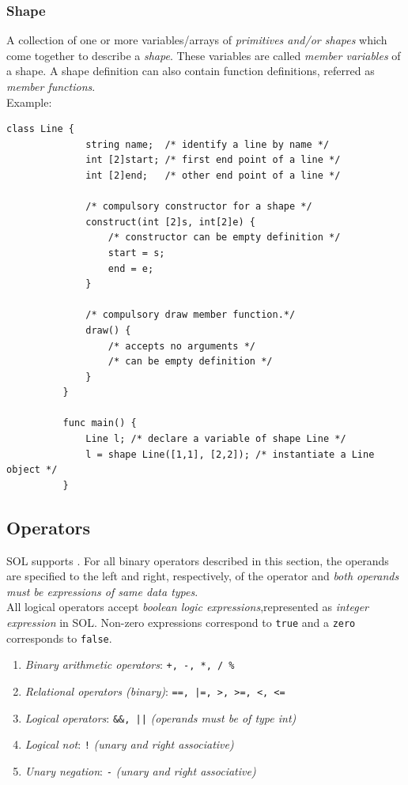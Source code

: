 \documentclass[letterpaper,12pt]{report}
\begin{document}
      \subsubsection{Shape}
        A collection of one or more variables/arrays of \textit{primitives and/or shapes} which come together to describe a \textit{shape}. These variables are called \textit{member variables} of a shape. A shape definition can also contain function definitions, referred as \textit{member functions}.\\
        Example:\\
        \begin{lstlisting}[style=sol]
          class Line {
              string name;  /* identify a line by name */
              int [2]start; /* first end point of a line */
              int [2]end;   /* other end point of a line */

              /* compulsory constructor for a shape */
              construct(int [2]s, int[2]e) {
                  /* constructor can be empty definition */
                  start = s;
                  end = e;
              }

              /* compulsory draw member function.*/
              draw() {
                  /* accepts no arguments */
                  /* can be empty definition */
              }
          }

          func main() {
              Line l; /* declare a variable of shape Line */
              l = shape Line([1,1], [2,2]); /* instantiate a Line object */
          }
        \end{lstlisting}

    \subsection{Operators}
    SOL supports . For all binary operators described in this section, the operands are specified to the left and right, respectively, of the operator and \textit{both operands must be expressions of same data types}.\\
    All logical operators accept \textit{boolean logic expressions},represented as \textit{integer expression} in SOL. Non-zero expressions correspond to \texttt{true} and a \texttt{zero} corresponds to \texttt{false}. 

    \begin{enumerate}
      \itemsep 0em
      \item \textit{Binary arithmetic operators}: \texttt{+, -, *, / \%}
      \item \textit{Relational operators (binary)}: \texttt{==, |=, >, >=, <, <=}
      \item \textit{Logical operators}: \texttt{\&\&, ||} \textit{(operands must be of type int)}
      \item \textit{Logical not}: \texttt{!} \textit{(unary and right associative)}
      \item \textit{Unary negation}: \texttt{-} \textit{(unary and right associative)}
    \end{enumerate}
\end{document}
